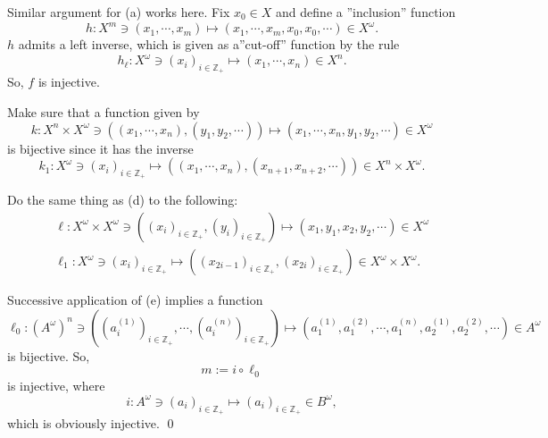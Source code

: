 \documentclass[a4paper,12pt]{article}
\begin{document}
\begin{sol}
	Similar argument for (a) works here.
	Fix
	\( x_0 \in X \)
	and define a ''inclusion'' function
	\begin{equation*}
		h:X^m \ni (x_1,\cdots,x_m)
		\mapsto
		(x_1,\cdots,x_m,x_0,x_0,\cdots) \in X^{\omega}.
	\end{equation*}
	\( h \)
	admits a left inverse, which is given as a''cut-off'' function by the rule
	\begin{equation*}
		h_{\ell}:X^{\omega} \ni (x_i)_{i \in \mathbb{Z}_{+}}
		\mapsto
		(x_1,\cdots,x_n) \in X^n.
	\end{equation*}
	So, \( f \) is injective.
	
	Make sure that a function given by
	\begin{equation*}
		k:X^n \times X^{\omega} \ni
		((x_1,\cdots,x_n),(y_1,y_2,\cdots))
		\mapsto
		(x_1,\cdots,x_n,y_1,y_2,\cdots)
		\in X^{\omega}
	\end{equation*}
	is bijective since it has the inverse
	\begin{equation*}
		k_1:X^{\omega} \ni
		(x_i)_{i \in \mathbb{Z}_{+}}
		\mapsto
		((x_1,\cdots,x_n),(x_{n+1},x_{n+2},\cdots))
		\in X^n \times X^{\omega}.
	\end{equation*}
	
	Do the same thing as (d) to the following:
	\begin{eqnarray*}
		&&\ell : X^{\omega} \times X^{\omega} \ni
		\left( (x_i)_{i \in \mathbb{Z}_{+}}, (y_i)_{i \in \mathbb{Z}_{+}} \right)
		\mapsto
		(x_1,y_1,x_2,y_2,\cdots)
		\in X^{\omega}\\
		&&\ell_1 : X^{\omega} \ni
		\left( x_i \right)_{i \in \mathbb{Z}_{+}}
		\mapsto
		\left(	\left( x_{2i-1} \right)_{i \in \mathbb{Z}_{+}},
		\left( x_{2i} \right)_{i \in \mathbb{Z}_{+}}
		\right)
		\in X^{\omega} \times X^{\omega}.
	\end{eqnarray*}
	
	Successive application of (e) implies a function
	\begin{equation*}
		\ell_0:	\left( A^{\omega} \right)^n
		\ni 	\left( (a_i ^{(1)})_{i \in \mathbb{Z}_{+}},
		\cdots,
		(a_i ^{(n)})_{i \in \mathbb{Z}_{+}}
		\right)
		\mapsto
		\left( a_1 ^{(1)}, a_1 ^{(2)},\cdots,a_1 ^{(n)},
		a_2 ^{(1)}, a_2 ^{(2)},\cdots
		\right)
		\in A^{\omega}
	\end{equation*}
	is bijective.
	So,
	\begin{equation*}
		m:=i\circ \ell_0
	\end{equation*}
	is injective,
	where
	\begin{equation*}
		i:A^{\omega} \ni (a_i)_{i \in \mathbb{Z}_{+}}
		\mapsto
		(a_i)_{i \in \mathbb{Z}_{+}} \in B^{\omega},
	\end{equation*}
	which is obviously injective.
	\qed\end{sol}
\end{document}
